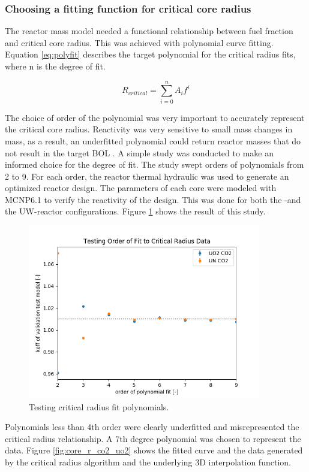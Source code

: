 \subsubsection{Choosing a fitting function for critical core radius}
The reactor mass model needed a functional relationship between fuel fraction
and critical core radius. This was achieved with polynomial curve fitting.
Equation \ref{eq:polyfit} describes the target polynomial for the critical
radius fits, where n is the degree of fit.

\begin{equation}
    R_{critical} = \sum_{i=0}^n A_if^i
    \label{eq:polyfit}
\end{equation}

The choice of order of the polynomial was very important to accurately represent the
critical core radius. Reactivity was very sensitive to small mass changes in mass, as
a result, an underfitted polynomial could return reactor masses that do not
result in the target BOL \keff. A simple study was conducted to make an informed
choice for the degree of fit. The study swept orders of polynomials from 2 to 9.
For each order, the reactor thermal hydraulic was used to generate an optimized reactor
design. The parameters of each core were modeled with MCNP6.1 to verify the
reactivity of the design. This was done for both the \uox-\codiox and
the UW-\codiox reactor configurations. Figure \ref{fig:fit_order_test} shows the
result of this study.

\begin{figure}[h]
    \centering
    \includegraphics[width=4in]{../images/poly_order_test.png}
\caption{Testing critical radius fit polynomials.}
\label{fig:fit_order_test}
\end{figure}

Polynomials less than 4th order were clearly underfitted and misrepresented the
critical radius relationship. A 7th degree polynomial was chosen to represent the
data. Figure \ref{fig:core_r_co2_uo2} shows the fitted curve and the
data generated by the critical radius algorithm and the underlying 3D
interpolation function.

